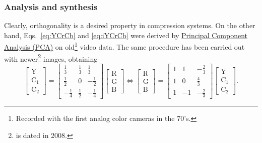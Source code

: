 \subsubsection{Analysis and synthesis}
Clearly, orthogonality is a desired property in compression
systems. On the other hand, Eqs.~\ref{eq:YCrCb} and \ref{eq:iYCrCb}
were derived by
\href{https://en.wikipedia.org/wiki/Principal_component_analysis}{Principal
  Component Analysis (PCA)} on old\footnote{Recorded with the first
analog color cameras in the 70's.} video data. The same procedure has
been carried out with newer\footnote{\cite{malvar2008lifting} is dated
in 2008.} images, obtaining
\begin{equation}
  \begin{bmatrix}
    \text{Y} \\
    \text{C}_1 \\
    \text{C}_2
  \end{bmatrix}
  =
  \begin{bmatrix}
    \frac{1}{3} & \frac{1}{3} &  \frac{1}{3} \\ 
    \frac{1}{2} &           0 & -\frac{1}{2} \\
   -\frac{1}{4} & \frac{1}{2} & -\frac{1}{4}
  \end{bmatrix}
  \begin{bmatrix}
    \text{R} \\
    \text{G} \\
    \text{B}
  \end{bmatrix}
  \Leftrightarrow
  \begin{bmatrix}
    \text{R} \\
    \text{G} \\
    \text{B}
  \end{bmatrix}
  =
  \begin{bmatrix}
    1  &  1  & -\frac{2}{3} \\ 
    1  &  0  &  \frac{4}{3} \\ 
    1  & -1  & -\frac{2}{3}
  \end{bmatrix}
  \begin{bmatrix}
    \text{Y} \\
    \text{C}_1 \\
    \text{C}_2
  \end{bmatrix}.
\end{equation}

